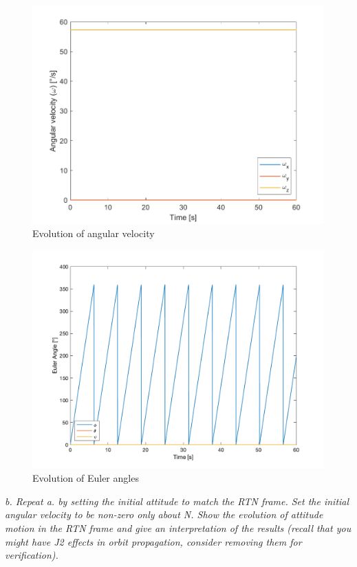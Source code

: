 \begin{figure}[H]
\centering
\includegraphics[scale=0.6]{Images/ps4_problem1a_velocity.png}
\caption{Evolution of angular velocity}
\label{fig:ps4_problem1a_velocity}
\end{figure}

\begin{figure}[H]
\centering
\includegraphics[scale=0.6]{Images/ps4_problem1a_angle.png}
\caption{Evolution of Euler angles}
\label{fig:ps4_problem1a_angle}
\end{figure}

\textit{b. Repeat a. by setting the initial attitude to match the RTN frame. Set the initial angular velocity to be non-zero only about N. Show the evolution of attitude motion in the RTN frame and give an interpretation of the results (recall that you might have J2 effects in orbit propagation, consider removing them for verification).}

